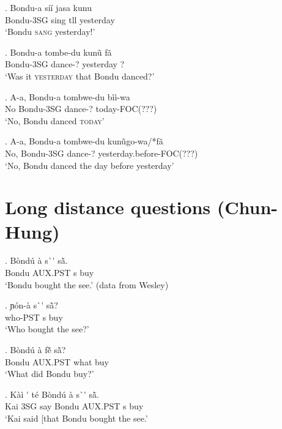 \documentclass{assets/fieldnotes}
\begin{document}
{\exg. Bondu-a síí jasa kunu\\
Bondu-3SG sing tll yesterday\\
`Bondu \textsc{sang} yesterday!'

\exg. Bondu-a tombe-du kunũ fã\\
Bondu-3SG dance-? yesterday ?\\
`Was it \textsc{yesterday} that Bondu danced?'

\exg. A-a, Bondu-a tombwe-du bìì-wa\\
No Bondu-3SG dance-? today-FOC(???)\\
`No, Bondu danced \textsc{today}'

\exg. A-a, Bondu-a tombwe-du kunũgo-wa/*fã\\
No, Bondu-3SG dance-? yesterday.before-FOC(???)\\
`No, Bondu danced the day before yesterday'


\section{Long distance questions (Chun-Hung)}



\exg. B\`{o}nd\'{u} \`{a} s\`{}\'{} sã̀. \\ 
Bondu AUX.PST s buy \\
`Bondu bought the see.' (data from Wesley)

\exg. ɲ\'{o}n-\`{a} s\`{}\'{} sã̀? \\ 
who-PST s buy \\
`Who bought the see?'

\exg. B\`{o}nd\'{u} \`{a} fẽ̌ sã̀? \\ 
Bondu AUX.PST what buy \\
`What did Bondu buy?'

\exg. K\`{a}\`{i} \'{} t\'{e} B\`{o}nd\'{u} \`{a} s\`{}\'{} sã̀. \\ 
Kai 3SG say Bondu AUX.PST s buy \\
`Kai said [that Bondu bought the see.'


}
\end{document}
